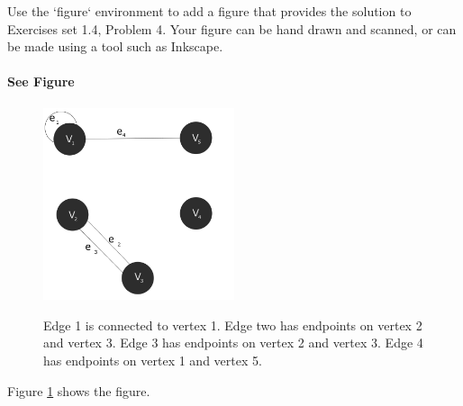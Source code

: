 \documentclass{article}
\begin{document}
Use the `figure` environment to add a figure that provides the solution to
Exercises set 1.4, Problem 4.  Your figure can be hand drawn and scanned, or can
be made using a tool such as Inkscape.

\paragraph{See Figure}
\begin{figure}
  \caption{Edge 1 is connected to vertex 1. 
Edge two has endpoints on vertex 2 and vertex 3. 
Edge 3 has endpoints on vertex 2 and vertex 3. 
Edge 4 has endpoints on vertex 1 and vertex 5.}
  \centering
  \includegraphics[width=0.5\textwidth]{ExcerciseProblem04}
  \label{fig:P04}
\end{figure}

Figure \ref{fig:P04} shows the figure.
\end{document}
